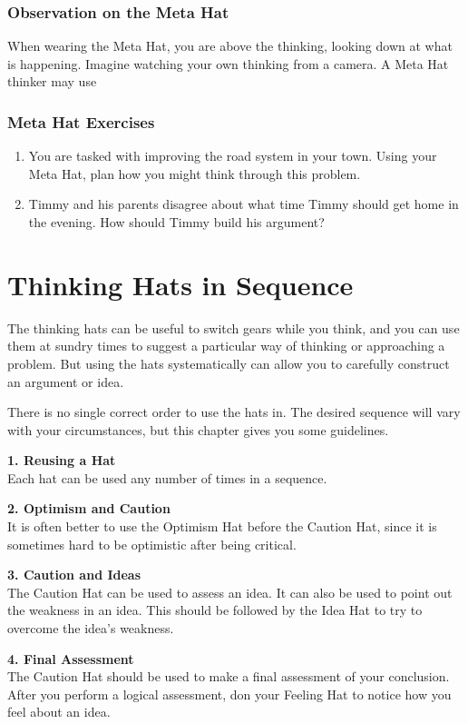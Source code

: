\subsection*{Observation on the Meta Hat}
When wearing the Meta Hat, you are above the thinking, looking down at what is happening. Imagine watching your own thinking from a camera. A Meta Hat thinker may use 

\subsection*{Meta Hat Exercises}
\begin{enumerate}
	\item You are tasked with improving the road system in your town. Using your Meta Hat, plan how you might think through this problem.
	\item Timmy and his parents disagree about what time Timmy should get home in the evening. How should Timmy build his argument?
\end{enumerate}


\chapter{Thinking Hats in Sequence}

The thinking hats can be useful to switch gears while you think, and you can use them at sundry times to suggest a particular way of thinking or approaching a problem. But using the hats systematically can allow you to carefully construct an argument or idea.

There is no single correct order to use the hats in. The desired sequence will vary with your circumstances, but this chapter gives you some guidelines.

\textbf{1. Reusing a Hat} \\
Each hat can be used any number of times in a sequence.

\textbf{2. Optimism and Caution} \\
It is often better to use the Optimism Hat before the Caution Hat, since it is sometimes hard to be optimistic after being critical.

\textbf{3. Caution and Ideas} \\
The Caution Hat can be used to assess an idea. It can also be used to point out the weakness in an idea. This should be followed by the Idea Hat to try to overcome the idea's weakness.

\textbf{4. Final Assessment} \\
The Caution Hat should be used to make a final assessment of your conclusion. After you perform a logical assessment, don your Feeling Hat to notice how you feel about an idea.

